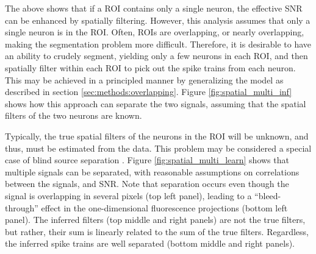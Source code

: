 \documentclass{article}
\begin{document}
The above shows that if a ROI contains only a single neuron, the effective SNR can be enhanced by spatially filtering.  However, this analysis assumes that only a single neuron is in the ROI.  Often, ROIs are overlapping, or nearly overlapping, making the segmentation problem more difficult.  Therefore, it is desirable to have an ability to crudely segment, yielding only a few neurons in each ROI, and then spatially filter within each ROI to pick out the spike trains from each neuron.  This may be achieved in a principled manner by generalizing the model as described in section \ref{sec:methods:overlapping}.  Figure \ref{fig:spatial_multi_inf} shows how this approach can separate the two signals, assuming that the spatial filters of the two neurons are known.  %

Typically, the true spatial filters of the neurons in the ROI will be unknown, and thus, must be estimated from the data.  This problem may be considered a special case of blind source separation \cite{BellSejnowski95, MukamelSchnitzer09}. Figure \ref{fig:spatial_multi_learn} shows that multiple signals can be separated, with reasonable assumptions on correlations between the signals, and SNR.  Note that separation occurs even though the signal is overlapping in several pixels (top left panel), leading to a ``bleed-through'' effect in the one-dimensional fluorescence projections (bottom left panel). The inferred filters (top middle and right panels) are not the true filters, but rather, their sum is linearly related to the sum of the true filters.  Regardless, the inferred spike trains are well separated (bottom middle and right panels).
\end{document}
